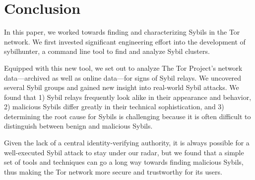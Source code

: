 \section{Conclusion}
\label{sec:conclusion}
In this paper, we worked towards finding and characterizing Sybils in the Tor
network.  We first invested significant engineering effort into the development
of sybilhunter, a command line tool to find and analyze Sybil clusters.

Equipped with this new tool, we set out to analyze The Tor Project's network
data---archived as well as online data---for signs of Sybil relays.  We
uncovered several Sybil groups and gained new insight into real-world Sybil
attacks.  We found that 1) Sybil relays frequently look alike in their
appearance and behavior, 2) malicious Sybils differ greatly in their technical
sophistication, and 3) determining the root cause for Sybils is challenging
because it is often difficult to distinguish between benign and malicious
Sybils.


Given the lack of a central identity-verifying authority, it is always possible
for a well-executed Sybil attack to stay under our radar, but we found that a
simple set of tools and techniques can go a long way towards finding malicious
Sybils, thus making the Tor network more secure and trustworthy for its users.
